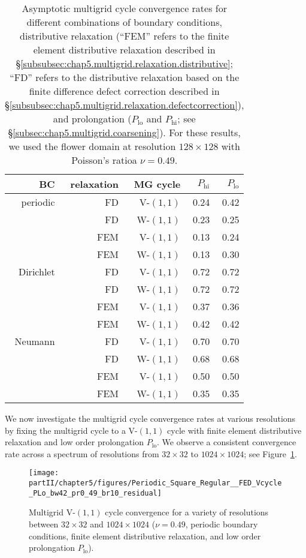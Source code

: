 \begin{table}[htbp]
\centering
\begin{tabular}{*{5}{r}}
\hline
BC & relaxation & MG cycle & $P_{\text{hi}}$ & $P_{\text{lo}}$ \\
\hline\hline
periodic & FD  & V-$(1,1)$ & 0.24 & 0.42 \\
         & FD  & W-$(1,1)$ & 0.23 & 0.25 \\
         & FEM & V-$(1,1)$ & 0.13 & 0.24 \\
         & FEM & W-$(1,1)$ & 0.13 & 0.30 \\
\hline
Dirichlet & FD  & V-$(1,1)$ & 0.72 & 0.72 \\
          & FD  & W-$(1,1)$ & 0.72 & 0.72 \\
          & FEM & V-$(1,1)$ & 0.37 & 0.36 \\
          & FEM & W-$(1,1)$ & 0.42 & 0.42 \\
\hline
Neumann & FD  & V-$(1,1)$ & 0.70 & 0.70 \\
        & FD  & W-$(1,1)$ & 0.68 & 0.68 \\
        & FEM & V-$(1,1)$ & 0.50 & 0.50 \\
        & FEM & W-$(1,1)$ & 0.35 & 0.35 \\
\hline
\end{tabular}
\caption{Asymptotic multigrid cycle convergence rates for different combinations of boundary conditions, distributive relaxation (``FEM'' refers to the finite element distributive relaxation described in \S\ref{subsubsec:chap5.multigrid.relaxation.distributive}; ``FD'' refers to the distributive relaxation based on the finite difference defect correction described in \S\ref{subsubsec:chap5.multigrid.relaxation.defectcorrection}), and prolongation ($P_{\text{lo}}$ and $P_{\text{hi}}$; see \S\ref{subsec:chap5.multigrid.coarsening}). For these results, we used the flower domain at resolution $128 \times 128$ with Poisson's ratioa $\nu = 0.49$.}
\label{tab:chap5.multigrid.convergence}
\end{table}

We now investigate the multigrid cycle convergence rates at various resolutions by fixing the multigrid cycle to a V-$(1,1)$ cycle with finite element distributive relaxation and low order prolongation $P_{\text{lo}}$. We observe a consistent convergence rate across a spectrum of resolutions from $32 \times 32$ to $1024 \times 1024$; see Figure~\ref{fig:chap5.multigrid.convergence.resolution}.

\setlength{\figurewidth}{0.50\textwidth}
\begin{figure}[htbp]
\centering
\texttt{[image: partII/chapter5/figures/Periodic\_Square\_Regular\_\_FED\_Vcycle\_PLo\_bw42\_pr0\_49\_br10\_residual]}
\caption{Multigrid V-$(1,1)$ cycle convergence for a variety of resolutions between $32 \times 32$ and $1024 \times 1024$ ($\nu = 0.49$, periodic boundary conditions, finite element distributive relaxation, and low order prolongation $P_{\text{lo}}$).}
\label{fig:chap5.multigrid.convergence.resolution}
\end{figure}


